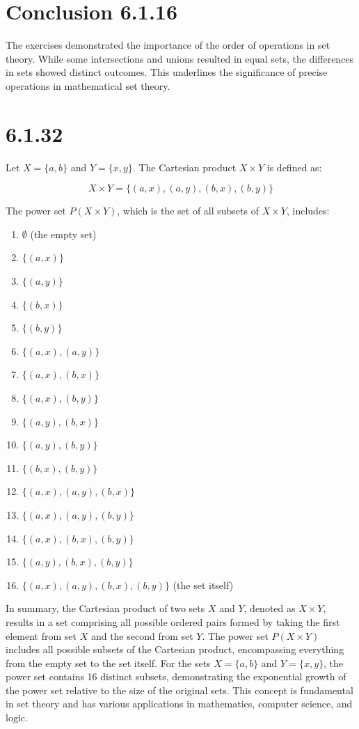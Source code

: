 \documentclass[12pt]{article}
\begin{document}
\section*{Conclusion 6.1.16}

The exercises demonstrated the importance of the order of operations in set theory. While some intersections and unions resulted in equal sets, the differences in sets showed distinct outcomes. This underlines the significance of precise operations in mathematical set theory.

\section*{6.1.32}

Let $X = \{a, b\}$ and $Y = \{x, y\}$. The Cartesian product $X \times Y$ is defined as:

\[ X \times Y = \{(a, x), (a, y), (b, x), (b, y)\} \]

The power set $P(X \times Y)$, which is the set of all subsets of $X \times Y$, includes:

\begin{enumerate}
    \item $\emptyset$ (the empty set)
    \item $\{(a, x)\}$
    \item $\{(a, y)\}$
    \item $\{(b, x)\}$
    \item $\{(b, y)\}$
    \item $\{(a, x), (a, y)\}$
    \item $\{(a, x), (b, x)\}$
    \item $\{(a, x), (b, y)\}$
    \item $\{(a, y), (b, x)\}$
    \item $\{(a, y), (b, y)\}$
    \item $\{(b, x), (b, y)\}$
    \item $\{(a, x), (a, y), (b, x)\}$
    \item $\{(a, x), (a, y), (b, y)\}$
    \item $\{(a, x), (b, x), (b, y)\}$
    \item $\{(a, y), (b, x), (b, y)\}$
    \item $\{(a, x), (a, y), (b, x), (b, y)\}$ (the set itself)
\end{enumerate}

In summary, the Cartesian product of two sets $X$ and $Y$, denoted as $X \times Y$, results in a set comprising all possible ordered pairs formed by taking the first element from set $X$ and the second from set $Y$. The power set $P(X \times Y)$ includes all possible subsets of the Cartesian product, encompassing everything from the empty set to the set itself. For the sets $X = \{a, b\}$ and $Y = \{x, y\}$, the power set contains 16 distinct subsets, demonstrating the exponential growth of the power set relative to the size of the original sets. This concept is fundamental in set theory and has various applications in mathematics, computer science, and logic.
\end{document}
